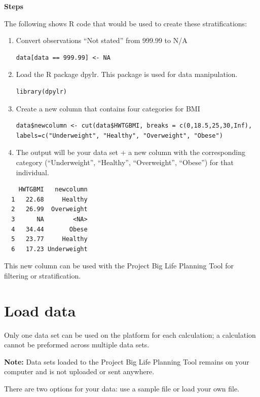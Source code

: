 \documentclass[]{book}
\begin{document}
\textbf{Steps}

The following shows R code that would be used to create these
stratifications:

\begin{enumerate}
\def\labelenumi{\arabic{enumi}.}
\item
  Convert observations ``Not stated'' from 999.99 to N/A

\begin{verbatim}
data[data == 999.99] <- NA
\end{verbatim}
\item
  Load the R package dpylr. This package is used for data manipulation.

\begin{verbatim}
library(dpylr)
\end{verbatim}
\item
  Create a new column that contains four categories for BMI

\begin{verbatim}
data$newcolumn <- cut(data$HWTGBMI, breaks = c(0,18.5,25,30,Inf),  labels=c("Underweight", "Healthy", "Overweight", "Obese")
\end{verbatim}
\item
  The output will be your data set + a new column with the corresponding
  category (``Underweight'', ``Healthy'', ``Overweight'', ``Obese'') for
  that individual.
\end{enumerate}

\begin{verbatim}
    HWTGBMI   newcolumn
  1   22.68     Healthy
  2   26.99  Overweight
  3      NA        <NA>
  4   34.44       Obese
  5   23.77     Healthy
  6   17.23 Underweight
\end{verbatim}

This new column can be used with the Project Big Life Planning Tool for
filtering or stratification.

\section{Load data}\label{load-data}

Only one data set can be used on the platform for each calculation; a
calculation cannot be preformed across multiple data sets.

\textbf{Note:} Data sets loaded to the Project Big Life Planning Tool
remains on your computer and is not uploaded or sent anywhere.

There are two options for your data: use a sample file or load your own
file.
\end{document}
